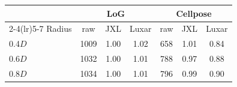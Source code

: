\begin{tabular}{lcccccc}
\toprule
 & \multicolumn{3}{c}{LoG} & \multicolumn{3}{c}{Cellpose} \\
\cmidrule(lr){2-4}\cmidrule(lr){5-7}
Radius & raw & JXL & Luxar & raw & JXL & Luxar \\
\midrule
0.4$D$ & 1009 & 1.00 & 1.02 & 658 & 1.01 & 0.84 \\
0.6$D$ & 1032 & 1.00 & 1.01 & 788 & 0.97 & 0.88 \\
0.8$D$ & 1034 & 1.00 & 1.01 & 796 & 0.99 & 0.90 \\
\bottomrule
\end{tabular}
